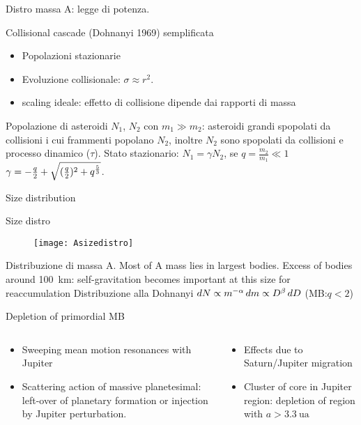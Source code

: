\begin{wordonframe}{Distro massa A: legge di potenza.}
\begin{block}{Collisional cascade (Dohnanyi 1969) semplificata}
\begin{itemize}
\item Popolazioni stazionarie
\item Evoluzione collisionale: $\sigma\approx r^2$.
\item scaling ideale: effetto di collisione dipende dai rapporti di massa
\end{itemize}
Popolazione di asteroidi $N_1$, $N_2$ con $m_1\gg m_2$: asteroidi grandi spopolati da collisioni i cui frammenti popolano $N_2$, inoltre $N_2$ sono spopolati da collisioni e processo dinamico ($\tau$).
Stato stazionario: $N_1=\gamma N_2$, se $q=\frac{m_2}{m_1}\ll1$ $\gamma=-\frac{q}{2}+\sqrt{(\frac{q}{2})^2+q^{\frac{5}{3}}}$.
\end{block}
\end{wordonframe}

\begin{frame}{Size distribution}
\begin{block}{Size distro}
\begin{figure}[!ht]\texttt{[image: Asizedistro]}
\end{figure}
\end{block}
\end{frame}

\begin{wordonframe}{Distribuzione di massa A.}
Most of A mass lies in largest bodies. Excess of bodies around \SI{100}{\kilo\meter}: self-gravitation becomes important at this size for reaccumulation
Distribuzione alla Dohnanyi  $dN\propto m^{-\alpha}\,dm\propto D^{\beta}\,dD$ (MB:$q<2$)
\end{wordonframe}

\begin{frame}{Depletion of primordial MB}
\begin{columns}[T]\begin{column}{0.5\textwidth}
\begin{itemize}
\item Sweeping mean motion resonances with Jupiter
\item Scattering action of massive planetesimal: left-over of planetary formation or injection by Jupiter perturbation.
\end{itemize}
\end{column}\begin{column}{0.5\textwidth}
\begin{itemize}
\item Effects due to Saturn/Jupiter migration
\item Cluster of core in Jupiter region: depletion of region with $a>\SI{3.3}{\astronomicalunit}$
\end{itemize}
\end{column}\end{columns}
\end{frame}

